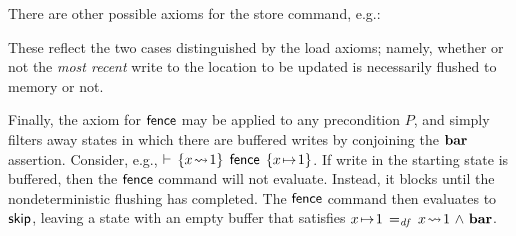\documentclass[11pt]{report}
\begin{document}
There are other possible axioms for the store command, e.g.: 

These reflect the two cases distinguished by the load axioms; namely, whether or not the \emph{most recent} write to the location to be updated is necessarily flushed to memory or not. 

Finally, the axiom for $\operatorname{\mathsf{fence}}$ may be applied to any precondition $P$, and simply filters away states in which there are buffered writes by conjoining the $\mathbf{bar}$ assertion. Consider, e.g., $\vdash\,\left\lbrace x \!\leadsto\! 1 \right\rbrace\;\operatorname{\mathsf{fence}}\;\left\lbrace x \!\mapsto\! 1 \right\rbrace$. If write in the starting state is buffered, then the $\operatorname{\mathsf{fence}}$ command will not evaluate. Instead, it blocks until the nondeterministic flushing has completed. The $\operatorname{\mathsf{fence}}$ command then evaluates to $\operatorname{\mathsf{skip}}$, leaving a state with an empty buffer that satisfies $x \!\mapsto\! 1 \operatorname{\;=_{\mathit{df}}\;} x \!\leadsto\! 1 \operatorname{\,\wedge\,} \mathbf{bar}$.  
\end{document}
